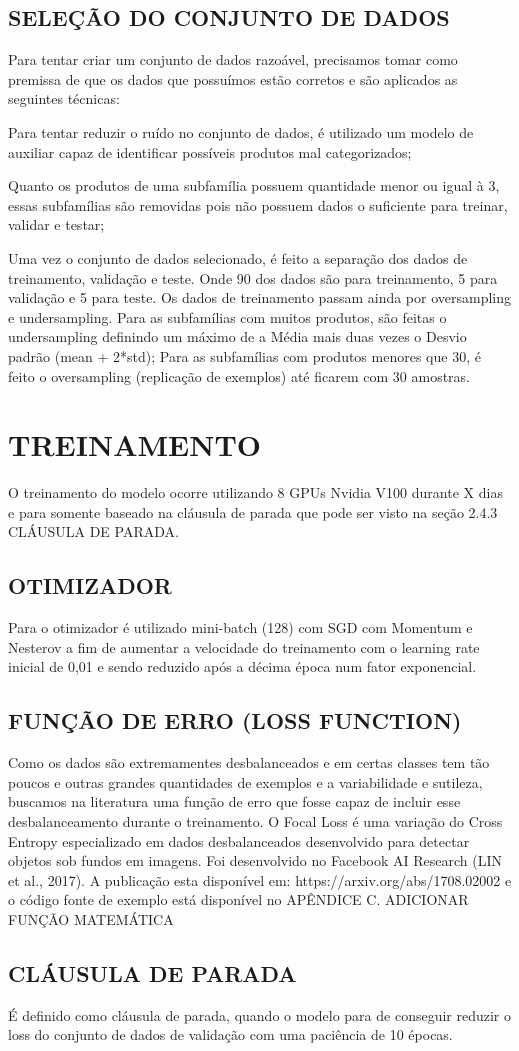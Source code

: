 \subsection{SELEÇÃO DO CONJUNTO DE DADOS}

Para tentar criar um conjunto de dados razoável, precisamos tomar como premissa de que os dados que possuímos estão corretos e são aplicados as seguintes técnicas:

Para tentar reduzir o ruído no conjunto de dados, é utilizado um modelo de auxiliar capaz de identificar possíveis produtos mal categorizados;

Quanto os produtos de uma subfamília possuem quantidade menor ou igual à 3, essas subfamílias são removidas pois não possuem dados o suficiente para treinar, validar e testar;

Uma vez o conjunto de dados selecionado, é feito a separação dos dados de treinamento, validação e teste. Onde 90 dos dados são para treinamento, 5 para validação e 5 para teste. Os dados de treinamento passam ainda por oversampling e undersampling.
Para as subfamílias com muitos produtos, são feitas o undersampling definindo um máximo de a Média mais duas vezes o Desvio padrão (mean + 2*std);
Para as subfamílias com produtos menores que 30, é feito o oversampling (replicação de exemplos) até ficarem com 30 amostras.

\section{TREINAMENTO}

O treinamento do modelo ocorre utilizando 8 GPUs Nvidia V100 durante X dias e para somente baseado na cláusula de parada que pode ser visto na seção 2.4.3 CLÁUSULA DE PARADA. 

\subsection{OTIMIZADOR}

Para o otimizador é utilizado mini-batch (128) com SGD com Momentum e Nesterov a fim de aumentar a velocidade do treinamento com o learning rate inicial de 0,01 e sendo reduzido após a décima época num fator exponencial.

\subsection{FUNÇÃO DE ERRO (LOSS FUNCTION)}

Como os dados são extremamentes desbalanceados e em certas classes tem tão poucos e outras grandes quantidades de exemplos e a variabilidade e sutileza, buscamos na literatura uma função de erro que fosse capaz de incluir esse desbalanceamento durante o treinamento.
O Focal Loss é uma variação do Cross Entropy especializado em dados desbalanceados desenvolvido para detectar objetos sob fundos em imagens. Foi desenvolvido no Facebook AI Research (LIN et al., 2017). A publicação esta disponível em: https://arxiv.org/abs/1708.02002 e o código fonte de exemplo está disponível no APÊNDICE C.
ADICIONAR FUNÇÃO MATEMÁTICA

\subsection{CLÁUSULA DE PARADA}

É definido como cláusula de parada, quando o modelo para de conseguir reduzir o loss do conjunto de dados de validação com uma paciência de 10 épocas.
